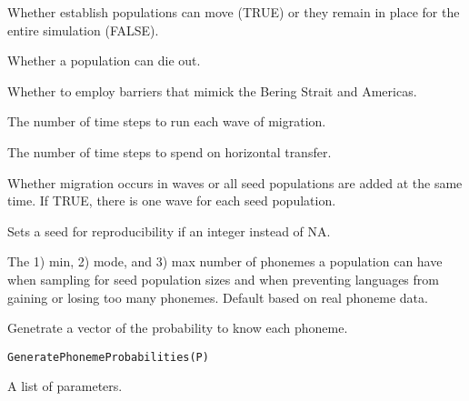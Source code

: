 \documentclass[a4paper]{book}
\begin{document}
\begin{Arguments}
\begin{ldescription}
\item[\code{UpRoot}] Whether establish populations can move (TRUE) or they remain in place for the entire simulation (FALSE).

\item[\code{Death}] Whether a population can die out.

\item[\code{Bering}] Whether to employ barriers that mimick the Bering Strait and Americas.

\item[\code{MigrationSimSteps}] The number of time steps to run each wave of migration.

\item[\code{HorizontalSimSteps}] The number of time steps to spend on horizontal transfer.

\item[\code{Waves}] Whether migration occurs in waves or all seed populations are added at the same time.  If TRUE, there is one wave for each seed population.

\item[\code{Seed}] Sets a seed for reproducibility if an integer instead of NA.

\item[\code{PhonemeDistribution}] The 1) min, 2) mode, and 3) max number of phonemes a population can have when sampling for seed population sizes and when preventing languages from gaining or losing too many phonemes. Default based on real phoneme data.
\end{ldescription}
\end{Arguments}
%
\begin{Description}\relax
Genetrate a vector of the probability to know each phoneme.
\end{Description}
%
\begin{Usage}
\begin{verbatim}
GeneratePhonemeProbabilities(P)
\end{verbatim}
\end{Usage}
%
\begin{Arguments}
\begin{ldescription}
\item[\code{P}] A list of parameters.
\end{ldescription}
\end{Arguments}
\end{document}
